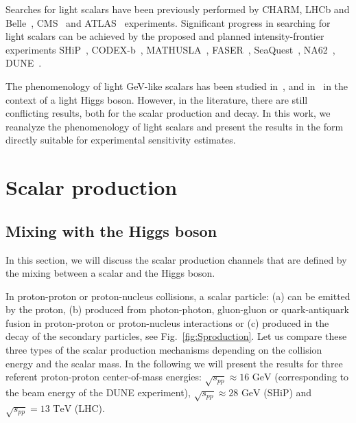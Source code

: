 \documentclass[a4paper,12pt,dvipsnames,usernames]{article}
\begin{document}
Searches for light scalars have been previously performed by CHARM, LHCb and Belle~\cite{Schmidt-Hoberg:2013hba,Clarke:2013aya}, CMS~\cite{Sirunyan:2018owy} and ATLAS~\cite{Aad:2015txa,Aaboud:2018sfi} experiments. Significant progress in searching for light scalars can be achieved by the proposed and planned intensity-frontier experiments SHiP~\cite{Alekhin:2015byh,Anelli:2015pba,SHiP:2018xqw}, CODEX-b~\cite{Gligorov:2017nwh}, MATHUSLA~\cite{Curtin:2018mvb,Chou:2016lxi,Curtin:2017izq,Evans:2017lvd,Helo:2018qej,Lubatti:2019vkf}, FASER~\cite{Feng:2017uoz,Feng:2017vli,Kling:2018wct}, SeaQuest~\cite{Berlin:2018pwi},  NA62~\cite{Mermod:2017ceo,CortinaGil:2017mqf,Drewes:2018gkc}, DUNE~\cite{Adams:2013qkq}. 

The phenomenology of light GeV-like scalars has been studied in~\cite{Bezrukov:2009yw,Clarke:2013aya,Bezrukov:2018yvd,Batell:2009jf,Winkler:2018qyg,Monin:2018lee,Bird:2004ts}, and in~\cite{Voloshin:1985tc,Raby:1988qf,Truong:1989my,Donoghue:1990xh,Willey:1982ti,Willey:1986mj,Grzadkowski:1983yp,Leutwyler:1989xj,Haber:1987ua,Chivukula:1988gp} in the context of a light Higgs boson. However, in the literature, there are still conflicting results, both for the scalar production and decay. In this work, we reanalyze the phenomenology of light scalars and present the results in the form directly suitable for experimental sensitivity estimates.


\section{Scalar production}
\label{sec:production}

\subsection{Mixing with the Higgs boson}

In this section, we will discuss the scalar production channels that are defined by the mixing between a scalar and the Higgs boson.

In proton-proton or proton-nucleus collisions, a scalar particle: (a) can be emitted by the proton, (b) produced from photon-photon, gluon-gluon or quark-antiquark fusion in proton-proton or proton-nucleus interactions or (c) produced in the decay of the secondary particles, see Fig.~\ref{fig:Sproduction}.
Let us compare these three types of the scalar production mechanisms depending on the collision energy and the scalar mass. In the following we will present the results for three referent proton-proton center-of-mass energies: $\sqrt{s_{pp}} \approx 16\text{ GeV}$ (corresponding to the beam energy of the DUNE experiment), $\sqrt{s_{pp}} \approx 28\text{ GeV}$ (SHiP) and $\sqrt{s_{pp}} = 13\text{ TeV}$ (LHC).
\end{document}
